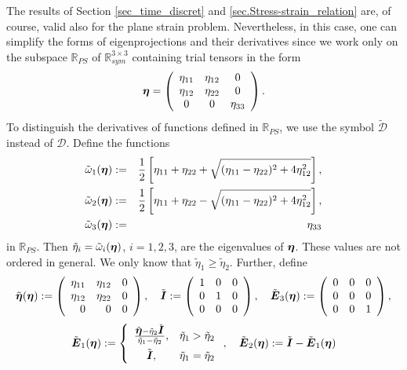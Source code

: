 \documentclass[a4paper,12pt]{article}
\theoremstyle{remark}
\newcommand{\mbf}[1]{\mbox{\boldmath$#1$}}
\numberwithin{equation}{section}
\begin{document}
The results of Section \ref{sec_time_discret} and \ref{sec.Stress-strain_relation} are, of course, valid also for the plane strain problem. Nevertheless, in this case, one can simplify the forms of eigenprojections and their derivatives since we work only on the subspace $\mathbb R_{PS}$ of $\mathbb R^{3\times 3}_{sym}$ containing trial tensors in the form
$$\mbf\eta=\left(
\begin{array}{ccc}
\eta_{11} & \eta_{12} & 0\\
\eta_{12} & \eta_{22} & 0\\
0 & 0 & \eta_{33}
\end{array}
\right).
$$
To distinguish the derivatives of functions defined in $\mathbb R_{PS}$, we use the symbol $\tilde{\mathcal D}$ instead of $\mathcal D$.  Define the functions
\begin{eqnarray*}
\tilde\omega_1(\mbf\eta)&:=&\frac{1}{2}\left[\eta_{11}+\eta_{22}+\sqrt{(\eta_{11}-\eta_{22})^2+4\eta_{12}^2}\right],\\
\tilde\omega_2(\mbf\eta)&:=&\frac{1}{2}\left[\eta_{11}+\eta_{22}-\sqrt{(\eta_{11}-\eta_{22})^2+4\eta_{12}^2}\right],\\
\tilde\omega_3(\mbf\eta)&:=&\eta_{33}
\end{eqnarray*}
in $\mathbb R_{PS}$. Then $\tilde\eta_i=\tilde\omega_i(\mbf\eta)$, $i=1,2,3$, are the eigenvalues of $\mbf\eta$. These values are not ordered in general. We only know that $\tilde\eta_1\geq\tilde\eta_2$. Further, define
$$\tilde{\mbf\eta}(\mbf\eta):=\left(
\begin{array}{r r r}
\eta_{11} & \eta_{12} & 0\\
\eta_{12} & \eta_{22} & 0\\
0 & 0 & 0
\end{array}
\right),\quad \tilde{\mbf I}:=\left(
\begin{array}{r r r}
1 & 0 & 0\\
0 & 1 & 0\\
0 & 0 & 0
\end{array}
\right), \quad \tilde{\mbf E}_3(\mbf\eta):=\left(
\begin{array}{r r r}
0 & 0 & 0\\
0 & 0 & 0\\
0 & 0 & 1
\end{array}
\right),$$
$$\tilde{\mbf E}_1(\mbf\eta):=\left\{
\begin{array}{c l}
\frac{\tilde{\mbf\eta}-\tilde\eta_2\tilde{\mbf I}}{\tilde\eta_1-\tilde\eta_2}, & \tilde\eta_1>\tilde\eta_2\\[2mm]
\tilde{\mbf I}, & \tilde\eta_1=\tilde\eta_2
\end{array}
\right.,\quad \tilde{\mbf E}_2(\mbf\eta):=\tilde{\mbf I}-\tilde{\mbf E}_1(\mbf\eta)$$
\end{document}
